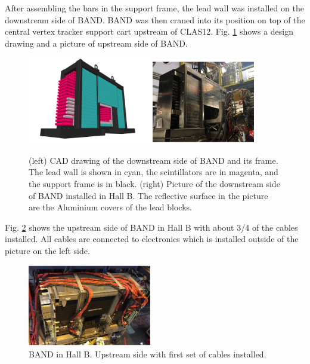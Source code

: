 \documentclass[3p,final,twocolumn]{elsarticle}
\begin{document}
After assembling the bars in the support frame, the lead wall was
installed on the downstream side of BAND. BAND was then
craned into its position on top of the central vertex tracker support
cart upstream of CLAS12. Fig. \ref{fig:band_downstream} shows a
design drawing and a picture of upstream side of BAND. 
\begin{figure}[tb]
	\centering
	\includegraphics[width=0.48\textwidth]{BAND_1-3.png} 
	\includegraphics[width=0.40\textwidth]{pic-bandinhall1.pdf}
		\caption{(left) CAD drawing of the downstream side of BAND and its frame. The lead wall is shown in cyan, the scintillators
          are in magenta, and the support frame is in black. (right) Picture of the downstream side of BAND installed in Hall B. The reflective surface in the picture are the Aluminium covers of the lead blocks.}
		\label{fig:band_downstream}
\end{figure}

Fig. \ref{fig:bandinhall} shows the upstream side of BAND in Hall B with about 3/4 of the cables installed. All cables are connected to
electronics which is installed outside of the picture on the left side.
\begin{figure}[tb]
	\centering
	\includegraphics[width=0.48\textwidth]{pic-bandinhall2.pdf}
				\caption{BAND in Hall B. Upstream side with first set of cables installed.}
		\label{fig:bandinhall}
\end{figure}
\end{document}
